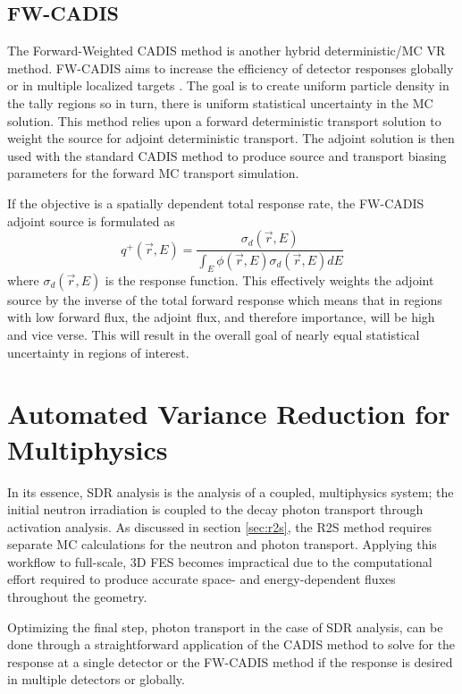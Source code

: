 \subsection{FW-CADIS}
The Forward-Weighted CADIS method is another hybrid deterministic/MC VR method.
FW-CADIS aims to increase the efficiency of 
detector responses globally or in multiple localized targets \cite{fwcadis}.
The goal is to create uniform particle density in the tally regions so in turn,
there is uniform statistical uncertainty in the MC solution.
This method relies upon a forward deterministic transport solution to
weight the source for adjoint deterministic transport.  The adjoint solution is
then used with the standard CADIS method to produce source and transport
biasing parameters for the forward MC transport simulation.

If the objective is a spatially dependent total response rate, the FW-CADIS 
adjoint source is formulated as
\begin{equation}
	q^{+}(\overrightarrow{r}, E) = \frac{\sigma_d(\overrightarrow{r}, E)}
	{\int_E
	 {\phi(\overrightarrow{r}, E)\sigma_d(\overrightarrow{r}, E)} dE}
\end{equation}
where $\sigma_d(\overrightarrow{r}, E) $ is the response function.
This effectively weights the adjoint source by the inverse of %
the total forward response
which means that in regions with low forward flux, the adjoint flux, and therefore
importance, will be high and vice verse.  This will result in the overall goal of
nearly equal statistical uncertainty in regions of interest.  

\section{Automated Variance Reduction for Multiphysics}\label{sec:auto_vr_sdr}

In its essence, SDR analysis is the analysis of a coupled, multiphysics system;
the initial neutron irradiation is coupled to the decay photon transport
through activation analysis.
As discussed in section \ref{sec:r2s}, the R2S method requires separate MC calculations 
for the neutron and photon transport.
Applying this workflow to full-scale, 3D FES becomes impractical 
due to the computational effort required
to produce accurate space- and energy-dependent fluxes throughout the geometry.

Optimizing the final step, photon transport in the case of SDR analysis,  
can be done through a straightforward application of the CADIS method to solve 
for the response at a single detector or the FW-CADIS method if the response is desired
in multiple detectors or globally. 

